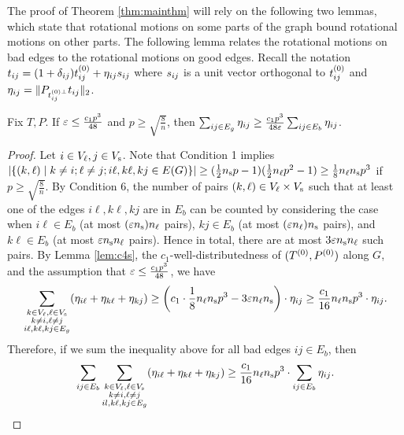 The proof of Theorem \ref{thm:mainthm} will rely on the following two lemmas, which state that rotational motions on some parts of the graph bound rotational motions on other parts. The following lemma relates the rotational motions on bad edges to the rotational motions on good edges.  Recall the notation $t_{ij} = (1 + \delta_{ij}) t^{{(0)}}_{ij} + \eta_{ij} s_{ij}$ where $s_{ij}$ is a unit vector orthogonal to $t^{{(0)}}_{ij}$ and $\eta_{ij} = \| P_{t^{{(0)}\perp}_{ij}} t_{ij} \|_2$. 



\begin{lemma} \label{lem:badgood-bipartite} 
Fix $T, P$. If $\varepsilon \leq \frac{c_1 p^3}{48}$ and $p \geq \sqrt{\frac{8}{n}}$, then $\sum_{ij\in E_{g}}\eta_{ij}\ge\frac{c_{1}p^{3}}{48\varepsilon}\sum_{ij\in E_{b}}\eta_{ij}$. 
\end{lemma}
\begin{proof}
Let $i \in V_\ell, j \in V_\text{s}$.  Note that Condition 1 implies $|\{(k,\ell) \mid k\neq i; \ell \neq j; i\ell,k\ell,kj\in E(G) \}|\geq (\frac{1}{2} n_\text{s} p -1) (\frac{1}{2} n_\ell p^2 - 1) \geq \frac{1}{8} n_\ell n_\text{s} p^3$ if $p \geq \sqrt{\frac{8}{n}}$. By Condition 6, the number of pairs $(k,\ell) \in V_\ell \times V_\text{s}$ such that at least one of the edges $i\ell, k\ell, kj$ are in $E_b$ can be counted by considering the case when $i\ell \in E_b$ (at most $(\varepsilon n_\text{s}) n_\ell$ pairs), $kj \in E_b$ (at most $(\varepsilon n_\ell) n_\text{s}$ pairs), and $k\ell \in E_b$ (at most $\varepsilon n_\text{s} n_\ell$ pairs). Hence in total, there are at most $3\varepsilon n_\text{s} n_\ell$ such pairs.
  By Lemma \ref{lem:c4s}, the $c_1$-well-distributedness of $(T^{(0)},P^{(0)})$ along $G$, and the assumption that $\varepsilon \leq  \frac{c_1 p^3}{48}$, we have 
\[
	\sum_{\substack{k \in V_\ell, \ell \in V_\text{s}\\k\neq i,\ell \neq j\\i\ell, k\ell, kj\in E_{g}}}(\eta_{i\ell}+\eta_{k\ell} + \eta_{kj})
	\ge\left(c_{1}\cdot\frac{1}{8}n_\ell n_\text{s} p^3- 3 \varepsilon n_\ell n_\text{s}\right)\cdot\eta_{ij}
	\ge\frac{c_{1}}{16}n_\ell n_\text{s} p^3\cdot\eta_{ij}.
\]
Therefore, if we sum the inequality above for all bad edges $ij\in E_{b}$, then
\[
	\sum_{ij\in E_{b}}
	\sum_{\substack{k \in V_\ell, \ell \in V_\text{s}\\k\neq i,\ell \neq j\\il, k\ell, kj\in E_{g}}}(\eta_{i\ell}+\eta_{k\ell} + \eta_{kj})
\ge\frac{c_{1}}{16}n_\ell n_\text{s} p^3\cdot\sum_{ij\in E_{b}}\eta_{ij}.
\]


\end{proof}
